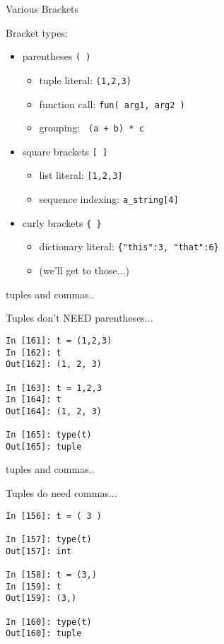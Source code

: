 \documentclass{beamer}
\begin{document}
\begin{frame}[fragile]{Various Brackets}

{\Large Bracket types:}

\begin{itemize}
  \item parentheses \verb+( )+
    \begin{itemize}
      \item tuple literal: \verb+(1,2,3)+
      \item function call: \verb+fun( arg1, arg2 )+
      \item grouping: \verb| (a + b) * c |
    \end{itemize}
  \item square brackets \verb+[ ]+
    \begin{itemize}
      \item list literal: \verb+[1,2,3]+
      \item sequence indexing: \verb+a_string[4]+
    \end{itemize}
  \item curly brackets \verb+{ }+
    \begin{itemize}
      \item dictionary literal: \verb+{"this":3, "that":6}+
      \item (we'll get to those...)
    \end{itemize}
\end{itemize}

\end{frame}


\begin{frame}[fragile]{tuples and commas..}

{\Large  Tuples don't NEED parentheses... }

\begin{verbatim}
In [161]: t = (1,2,3)
In [162]: t
Out[162]: (1, 2, 3)

In [163]: t = 1,2,3
In [164]: t
Out[164]: (1, 2, 3)

In [165]: type(t)
Out[165]: tuple
\end{verbatim}

\end{frame}

\begin{frame}[fragile]{tuples and commas..}

{\Large  Tuples do need commas... }

\begin{verbatim}
In [156]: t = ( 3 )

In [157]: type(t)
Out[157]: int

In [158]: t = (3,)
In [159]: t
Out[159]: (3,)

In [160]: type(t)
Out[160]: tuple
\end{verbatim}

\end{frame}
\end{document}
